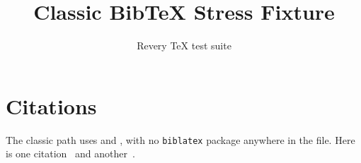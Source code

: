 \documentclass[11pt]{article}
\title{Classic BibTeX Stress Fixture}
\author{Revery TeX test suite}
\begin{document}
\maketitle

\section{Citations}
The classic path uses \verb|| and \verb||,
with no \texttt{biblatex} package anywhere in the file.
Here is one citation~\cite{classic1986} and another~\cite{classic1993}.



\end{document}
